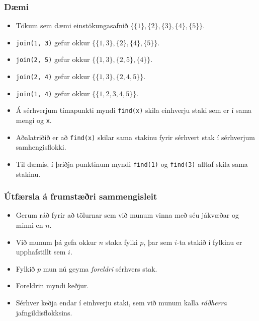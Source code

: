 \documentclass{beamer}
\begin{document}
\begin{frame}
\frametitle{Dæmi}
\begin{itemize}

	\item<1-> Tökum sem dæmi einstökungasafnið
		$\{\{1\}, \{2\}, \{3\}, \{4\}, \{5\}\}$. 
	\item<2-> \texttt{join(1, 3)} gefur okkur
		$\{\{1, 3\}, \{2\}, \{4\}, \{5\}\}$. 
	\item<3-> \texttt{join(2, 5)} gefur okkur
		$\{\{1, 3\}, \{2, 5\}, \{4\}\}$. 
	\item<4-> \texttt{join(2, 4)} gefur okkur
		$\{\{1, 3\}, \{2, 4, 5\}\}$. 
	\item<5-> \texttt{join(1, 4)} gefur okkur
		$\{\{1, 2, 3, 4, 5\}\}$. 
	\item<6-> Á sérhverjum tímapunkti myndi \texttt{find(x)} skila einhverju staki sem er í sama mengi og \texttt{x}.
	\item<7-> Aðalatriðið er að \texttt{find(x)} skilar sama stakinu fyrir sérhvert stak í sérhverjum samhengisflokki.
	\item<8-> Til dæmis, í þriðja punktinum myndi \texttt{find(1)} og \texttt{find(3)} alltaf skila sama stakinu.
\end{itemize}
\end{frame}

\begin{frame}
\frametitle{Útfærsla á frumstæðri sammengisleit}
\begin{itemize}
	\item<1-> Gerum ráð fyrir að tölurnar sem við munum vinna með séu jákvæðar og minni en $n$.
	\item<2-> Við munum þá gefa okkur $n$ staka fylki $p$, þar sem $i$-ta stakið í fylkinu er upphafstillt sem $i$.
	\item<3-> Fylkið $p$ mun nú geyma \emph{foreldri} sérhvers stak.
	\item<4-> Foreldrin myndi keðjur.
	\item<5-> Sérhver keðja endar í einhverju staki, sem við munum kalla \emph{ráðherra} jafngildisflokksins.
\end{itemize}
\end{frame}
\end{document}
